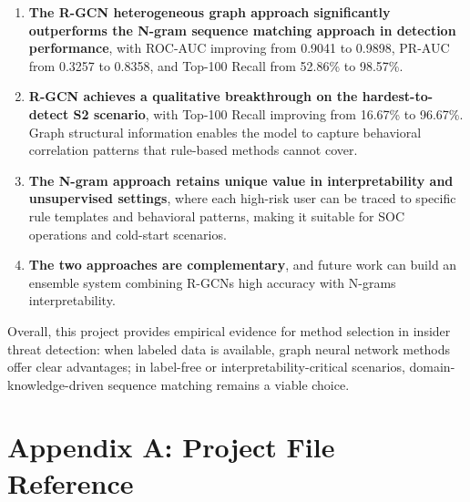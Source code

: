 \documentclass[
  a4paper,
  11pt]{article}
\begin{document}
\begin{enumerate}
\def\labelenumi{\arabic{enumi}.}
\item
  \textbf{The R-GCN heterogeneous graph approach significantly
  outperforms the N-gram sequence matching approach in detection
  performance}, with ROC-AUC improving from 0.9041 to 0.9898, PR-AUC
  from 0.3257 to 0.8358, and Top-100 Recall from 52.86\% to 98.57\%.
\item
  \textbf{R-GCN achieves a qualitative breakthrough on the
  hardest-to-detect S2 scenario}, with Top-100 Recall improving from
  16.67\% to 96.67\%. Graph structural information enables the model to
  capture behavioral correlation patterns that rule-based methods cannot
  cover.
\item
  \textbf{The N-gram approach retains unique value in interpretability
  and unsupervised settings}, where each high-risk user can be traced to
  specific rule templates and behavioral patterns, making it suitable
  for SOC operations and cold-start scenarios.
\item
  \textbf{The two approaches are complementary}, and future work can
  build an ensemble system combining R-GCN\textquotesingle s high
  accuracy with N-gram\textquotesingle s interpretability.
\end{enumerate}

Overall, this project provides empirical evidence for method selection
in insider threat detection: when labeled data is available, graph
neural network methods offer clear advantages; in label-free or
interpretability-critical scenarios, domain-knowledge-driven sequence
matching remains a viable choice.

\section{Appendix A: Project File
Reference}\label{appendix-a-project-file-reference}
\end{document}
